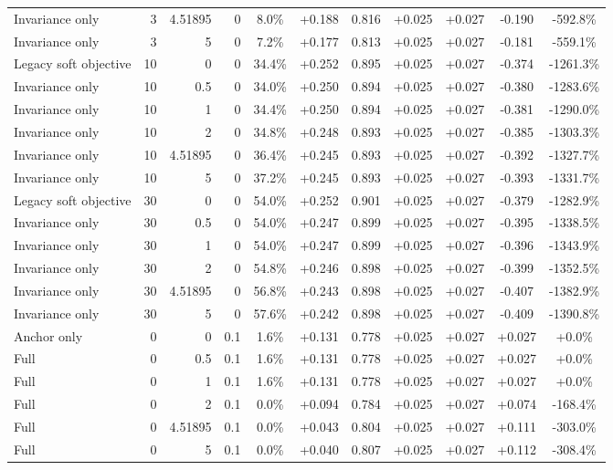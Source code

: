 \begin{table}[htbp]
\begin{tabular}{lrrrccccccc}
Invariance only & 3 & 4.51895 & 0 & 8.0\% & +0.188 & 0.816 & +0.025 & +0.027 & -0.190 & -592.8\% \\
Invariance only & 3 & 5 & 0 & 7.2\% & +0.177 & 0.813 & +0.025 & +0.027 & -0.181 & -559.1\% \\
Legacy soft objective & 10 & 0 & 0 & 34.4\% & +0.252 & 0.895 & +0.025 & +0.027 & -0.374 & -1261.3\% \\
Invariance only & 10 & 0.5 & 0 & 34.0\% & +0.250 & 0.894 & +0.025 & +0.027 & -0.380 & -1283.6\% \\
Invariance only & 10 & 1 & 0 & 34.4\% & +0.250 & 0.894 & +0.025 & +0.027 & -0.381 & -1290.0\% \\
Invariance only & 10 & 2 & 0 & 34.8\% & +0.248 & 0.893 & +0.025 & +0.027 & -0.385 & -1303.3\% \\
Invariance only & 10 & 4.51895 & 0 & 36.4\% & +0.245 & 0.893 & +0.025 & +0.027 & -0.392 & -1327.7\% \\
Invariance only & 10 & 5 & 0 & 37.2\% & +0.245 & 0.893 & +0.025 & +0.027 & -0.393 & -1331.7\% \\
Legacy soft objective & 30 & 0 & 0 & 54.0\% & +0.252 & 0.901 & +0.025 & +0.027 & -0.379 & -1282.9\% \\
Invariance only & 30 & 0.5 & 0 & 54.0\% & +0.247 & 0.899 & +0.025 & +0.027 & -0.395 & -1338.5\% \\
Invariance only & 30 & 1 & 0 & 54.0\% & +0.247 & 0.899 & +0.025 & +0.027 & -0.396 & -1343.9\% \\
Invariance only & 30 & 2 & 0 & 54.8\% & +0.246 & 0.898 & +0.025 & +0.027 & -0.399 & -1352.5\% \\
Invariance only & 30 & 4.51895 & 0 & 56.8\% & +0.243 & 0.898 & +0.025 & +0.027 & -0.407 & -1382.9\% \\
Invariance only & 30 & 5 & 0 & 57.6\% & +0.242 & 0.898 & +0.025 & +0.027 & -0.409 & -1390.8\% \\
Anchor only & 0 & 0 & 0.1 & 1.6\% & +0.131 & 0.778 & +0.025 & +0.027 & +0.027 & +0.0\% \\
Full & 0 & 0.5 & 0.1 & 1.6\% & +0.131 & 0.778 & +0.025 & +0.027 & +0.027 & +0.0\% \\
Full & 0 & 1 & 0.1 & 1.6\% & +0.131 & 0.778 & +0.025 & +0.027 & +0.027 & +0.0\% \\
Full & 0 & 2 & 0.1 & 0.0\% & +0.094 & 0.784 & +0.025 & +0.027 & +0.074 & -168.4\% \\
Full & 0 & 4.51895 & 0.1 & 0.0\% & +0.043 & 0.804 & +0.025 & +0.027 & +0.111 & -303.0\% \\
Full & 0 & 5 & 0.1 & 0.0\% & +0.040 & 0.807 & +0.025 & +0.027 & +0.112 & -308.4\% \\

\end{tabular}
\end{table}
